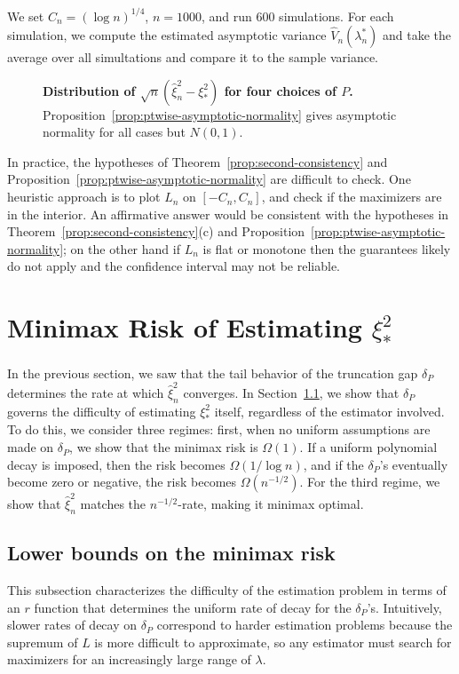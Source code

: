 \documentclass{article}
\theoremstyle{definition}
\newcommand{\1}{\mathbbm{1}}
\begin{document}
We set $C_n = (\log n)^{1/4}$, $n = 1000$, and run 600 simulations. For each simulation, we compute the estimated asymptotic variance $\hat V_n(\lambda^*_n)$ and take the average over all simultations and compare it to the sample variance.

\begin{figure}[h]
\centering
    \resizebox{0.6\linewidth}{!}{}
\caption{\textbf{Distribution of $\sqrt n(\hat \xi_n^2 - \xi_*^2)$ for four choices of $P$.} Proposition~\ref{prop:ptwise-asymptotic-normality} gives asymptotic normality for all cases but $N(0, 1)$.}
    \label{fig:asymptotic-normality}
\end{figure}
In practice, the hypotheses of Theorem~\ref{prop:second-consistency} and Proposition~\ref{prop:ptwise-asymptotic-normality} are difficult to check. One heuristic approach is to plot $L_n$ on $[-C_n, C_n]$, and check if the maximizers are in the interior. An affirmative answer would be consistent with the hypotheses in Theorem~\ref{prop:second-consistency}(c) and Proposition~\ref{prop:ptwise-asymptotic-normality}; on the other hand if $L_n$ is flat or monotone then the guarantees likely do not apply and the confidence interval may not be reliable.

\section{Minimax Risk of Estimating $\xi_*^2$}

In the previous section, we saw that the tail behavior of the truncation gap $\delta_P$ determines the rate at which $\hat \xi^2_n$ converges. In Section~\ref{sec:minimax-lower}, we show that $\delta_P$ governs the difficulty of estimating $\xi_*^2$ itself, regardless of the estimator involved. To do this, we consider three regimes: first, when no uniform assumptions are made on $\delta_P$, we show that the minimax risk is $\Omega(1)$. If a uniform polynomial decay is imposed, then the risk becomes $\Omega(1/\log n)$, and if the $\delta_P$'s eventually become zero or negative, the risk becomes $\Omega(n^{-1/2})$. For the third regime, we show that $\hat \xi_n^2$ matches the $n^{-1/2}$-rate, making it minimax optimal.

\subsection{Lower bounds on the minimax risk}
\label{sec:minimax-lower}
This subsection characterizes the difficulty of the estimation problem in terms of an $r$ function that determines the uniform rate of decay for the $\delta_P$'s. Intuitively, slower rates of decay on $\delta_P$ correspond to harder estimation problems because the supremum of $L$ is more difficult to approximate, so any estimator must search for maximizers for an increasingly large range of $\lambda$.
\end{document}
